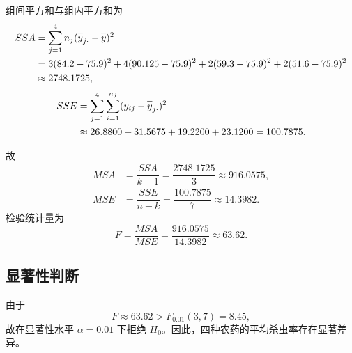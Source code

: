 \documentclass{article}
\newcommand{\barline}[1]{\overline{#1\rule{0pt}{1.5ex}}}
\begin{document}
组间平方和与组内平方和为
\[
\begin{aligned}
    SSA&=\sum_{j=1}^{4}n_j(\barline{y}_{j\cdot}-\barline{y})^2\\
       &=3(84.2-75.9)^2+4(90.125-75.9)^2+2(59.3-75.9)^2+2(51.6-75.9)^2\\
       &\approx 2748.1725,
\end{aligned}
\]
\[
\begin{aligned}
    SSE&=\sum_{j=1}^{4}\sum_{i=1}^{n_j}(y_{ij}-\barline{y}_{j\cdot})^2\\
       &\approx 26.8800+31.5675+19.2200+23.1200=100.7875.
\end{aligned}
\]

故
\[
\begin{aligned}
    MSA&=\dfrac{SSA}{k-1}=\dfrac{2748.1725}{3}\approx 916.0575,\\
    MSE&=\dfrac{SSE}{n-k}=\dfrac{100.7875}{7}\approx 14.3982.
\end{aligned}
\]
检验统计量为
\[
    F=\dfrac{MSA}{MSE}
     =\dfrac{916.0575}{14.3982}
     \approx 63.62 .
\]

\subsection{显著性判断}

由于
\[
    F\approx 63.62>F_{0.01}(3,7)=8.45,
\]
故在显著性水平 $\alpha=0.01$ 下拒绝 $H_0$。因此，四种农药的平均杀虫率存在显著差异。
\end{document}
